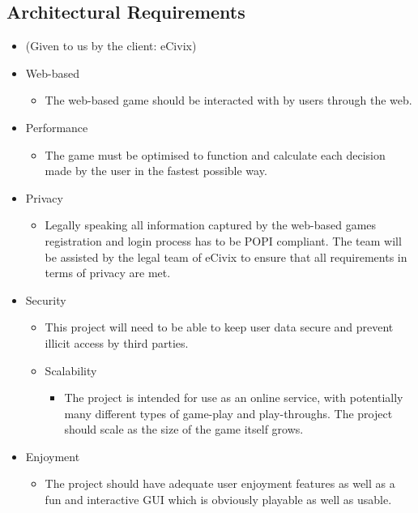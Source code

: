 \documentclass{article}
\begin{document}
   \subsection{Architectural Requirements}
   \begin{itemize}
   \item (Given to us by the client: eCivix)
        \item Web-based
		\begin{itemize}
			\item The web-based game should be interacted with by users through the web.
	    \end{itemize}
	    
	    \item Performance
		\begin{itemize}
			\item The game must be optimised to function and calculate each decision made by the user in the fastest possible way.
	    \end{itemize}
	    
	    \item Privacy 
		\begin{itemize}
			\item Legally speaking all information captured by the web-based games registration and login process has to be POPI compliant. The team will be assisted by the legal team of eCivix to ensure that all requirements in terms of privacy are met. 
	    \end{itemize}
	    
	    \item Security
		\begin{itemize}
			\item This project will need to be able to keep user data secure and prevent illicit access by third parties. 
            
		\item Scalability 
            		\begin{itemize}
				\item The project is intended for use as an online service, with potentially many different types of game-play and play-throughs. The project should scale as the size of the game itself grows. 
			\end{itemize}

	    \end{itemize}
	    
	    \item Enjoyment
		\begin{itemize}
			\item The project should have adequate user enjoyment features as well as a fun and interactive GUI which is obviously playable as well as usable. 
	    \end{itemize}
	    

\end{itemize}
\end{document}
